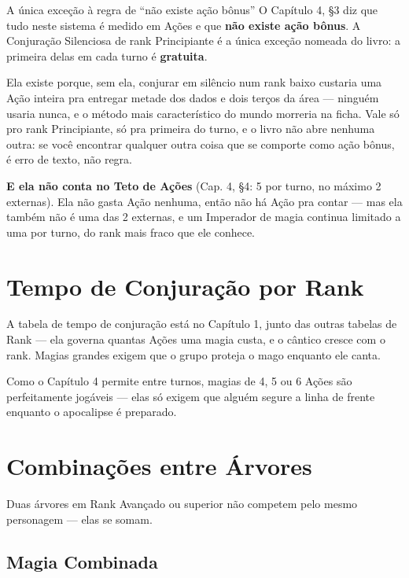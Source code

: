 \begin{aviso}{A única exceção à regra de \enquote{não existe ação bônus}}
    O Capítulo 4, §3 diz que tudo neste sistema é medido em Ações e que \textbf{não existe
    ação bônus}. A Conjuração Silenciosa de rank Principiante é a única exceção nomeada do
    livro: a primeira delas em cada turno é \textbf{gratuita}.

    \medskip
    Ela existe porque, sem ela, conjurar em silêncio num rank baixo custaria uma Ação
    inteira pra entregar metade dos dados e dois terços da área --- ninguém usaria nunca, e
    o método mais característico do mundo morreria na ficha. Vale só pro rank Principiante,
    só pra primeira do turno, e o livro não abre nenhuma outra: se você encontrar qualquer
    outra coisa que se comporte como ação bônus, é erro de texto, não regra.

    \medskip
    \textbf{E ela não conta no Teto de Ações} (Cap. 4, §4: 5 por turno, no máximo 2
    externas). Ela não gasta Ação nenhuma, então não há Ação pra contar --- mas ela também
    não é uma das 2 externas, e um Imperador de magia continua limitado a uma por turno, do
    rank mais fraco que ele conhece.
\end{aviso}

\section{Tempo de Conjuração por Rank}

A tabela de tempo de conjuração está no Capítulo 1, junto das outras tabelas de Rank ---
ela governa quantas Ações uma magia custa, e o cântico cresce com o rank. Magias grandes
exigem que o grupo proteja o mago enquanto ele canta.

Como o Capítulo 4 permite  entre turnos, magias de 4, 5 ou 6 Ações
são perfeitamente jogáveis --- elas só exigem que alguém segure a linha de frente enquanto
o apocalipse é preparado.

\section{Combinações entre Árvores}

Duas árvores em Rank Avançado ou superior não competem pelo mesmo personagem --- elas se
somam.

\subsection{Magia Combinada}

